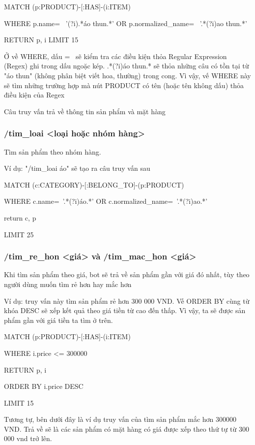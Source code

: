 \smallskip

MATCH (p:PRODUCT)-[:HAS]-(i:ITEM) 

WHERE p.name=~ '(?i).*áo thun.*' OR p.normalized\_name=~ '.*(?i)ao thun.*' 

RETURN p, i LIMIT 15

\smallskip

Ở về WHERE, dấu =~ sẽ kiểm tra các điều kiện thỏa Regular Expression (Regex) ghi trong dấu ngoặc kép. 
.*(?i)áo thun.* sẽ thỏa những câu có tồn tại từ "áo thun" (không phân biệt viết hoa, thường) trong cong. Vì vậy, vế WHERE này sẽ tìm những trường hợp mà nút PRODUCT có tên (hoặc tên không dấu) thỏa điều kiện của Regex  

Câu truy vấn trả về thông tin sản phẩm và mặt hàng 

\subsubsection{/tim\_loai <loại hoặc nhóm hàng> }

Tìm sản phẩm theo nhóm hàng.

Ví dụ: "/tim\_loai áo" sẽ tạo ra câu truy vấn sau
 
MATCH (c:CATEGORY)-[:BELONG\_TO]-(p:PRODUCT)

WHERE c.name=~'.*(?i)áo.*' OR c.normalized\_name=~'.*(?i)ao.*'  

return c, p

LIMIT 25

\smallskip

\subsubsection{/tim\_re\_hon <giá> và /tim\_mac\_hon <giá>}

Khi tìm sản phẩm theo giá, bot sẽ trả về sản phẩm gần với giá đó nhất, tùy theo người dùng muốn tìm rẻ hơn hay mắc hơn 

Ví dụ: truy vấn này tìm sản phẩm rẻ hơn 300 000 VND. Vế ORDER BY cùng từ khóa DESC sẽ xếp kết quả theo giá tiền từ cao đến thấp. Vì vậy, ta sẽ được sản phẩm gần với giá tiền ta tìm ở trên. 

MATCH (p:PRODUCT)-[:HAS]-(i:ITEM)

WHERE i.price <= 300000 

RETURN p, i 

ORDER BY i.price DESC 

LIMIT 15

\smallskip

Tương tự, bên dưới đây là ví dụ truy vấn của tìm sản phẩm mắc hơn 300000 VND. Trả về sẽ là các sản phẩm có mặt hàng có giá được xếp theo thứ tự từ 300 000 vnd trở lên. 

